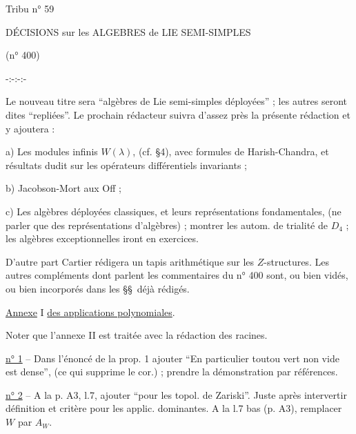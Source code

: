 \hfill Tribu n° 59

DÉCISIONS sur les ALGEBRES de LIE SEMI-SIMPLES

(n° 400)

\centerline{-:-:-:-}

Le nouveau titre sera ``algèbres de Lie semi-simples déployées'' ; les autres seront dites ``repliées''. Le prochain rédacteur suivra d'assez près la présente rédaction et y ajoutera :

a) Les modules infinis $W(\lambda)$, (cf. \S 4), avec formules de Harish-Chandra, et résultats dudit sur les opérateurs différentiels invariants ;

b) Jacobson-Mort aux Off ;

c) Les algèbres déployées classiques, et leurs représentations fondamentales, (ne parler que des représentations d'algèbres) ; montrer les autom. de trialité de $D_4$ ; les algèbres exceptionnelles iront en exercices.

D'autre part Cartier rédigera un tapis arithmétique sur les $Z$-structures. Les autres compléments dont parlent les commentaires du n° 400 sont, ou bien vidés, ou bien incorporés dans les \S\S\ déjà rédigés.

\uline{Annexe} I \uline{des applications polynomiales}.

Noter que l'annexe II est traitée avec la rédaction des racines.

\uline{n° 1} -- Dans l'énoncé de la prop. 1 ajouter ``En particulier toutou vert non vide est dense'', (ce qui supprime le cor.) ; prendre la démonstration par références.

\uline{n° 2} -- A la p. A3, l.7, ajouter ``pour les topol. de Zariski''. Juste après intervertir définition et critère pour les applic. dominantes. A la l.7 bas (p. A3), remplacer $W$ par $A_W$.
